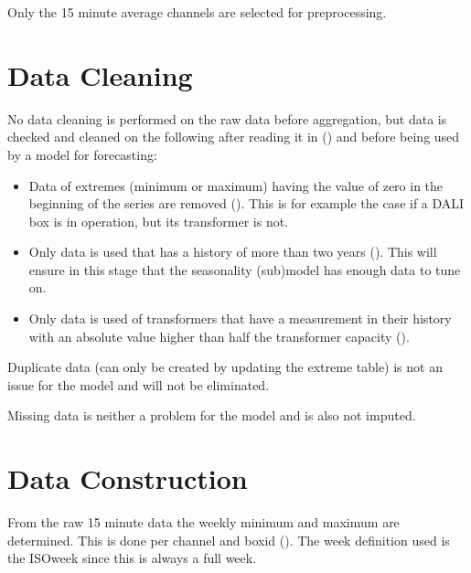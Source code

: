 \documentclass[letterpaper,10pt,english]{sphinxmanual}
\begin{document}
Only the 15 minute average channels are selected for preprocessing.


\section{Data Cleaning}
\label{\detokenize{data_preparation:data-cleaning}}
No data cleaning is performed on the raw data before aggregation, but data is checked and cleaned on the following after reading it in ({\hyperref[\detokenize{autoapi/src/preprocess/preprocess/index:src.preprocess.preprocess.load_data}]{}}) and before being used by a model for forecasting:
\begin{itemize}
\item {} 
Data of extremes (minimum or maximum) having the value of zero in the beginning of the series are removed ({\hyperref[\detokenize{autoapi/src/preprocess/preprocess/index:src.preprocess.preprocess.remove_leading_idling}]{}}). This is for example the case if a DALI box is in operation, but its transformer is not.

\item {} 
Only data is used that has a history of more than two years ({\hyperref[\detokenize{autoapi/src/preprocess/preprocess/index:src.preprocess.preprocess.too_short}]{}}). This will ensure in this stage that the seasonality (sub)model has enough data to tune on.

\item {} 
Only data is used of transformers that have a measurement in their history with an absolute value higher than half the transformer capacity ({\hyperref[\detokenize{autoapi/src/preprocess/preprocess/index:src.preprocess.preprocess.too_small}]{}}).

\end{itemize}

Duplicate data (can only be created by updating the extreme table) is not an issue for the model and will not be eliminated.

Missing data is neither a problem for the model and is also not imputed.


\section{Data Construction}
\label{\detokenize{data_preparation:data-construction}}
From the raw 15 minute data the weekly minimum and maximum are determined. This is done per channel and boxid ({\hyperref[\detokenize{autoapi/src/utils/snowflake/index:src.utils.snowflake.make_week_extremes_query}]{}}).
The week definition used is the ISO\sphinxhyphen{}week since this is always a full week.
\end{document}
